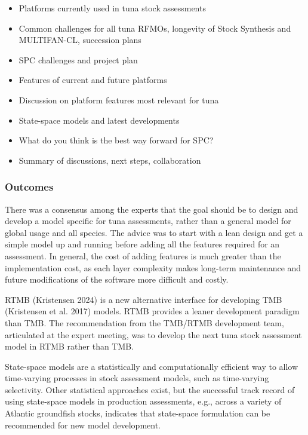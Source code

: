\documentclass{SCreport}
\begin{document}
\begin{itemize}
  \item Platforms currently used in tuna stock assessments\\[-4ex]
  \item Common challenges for all tuna RFMOs, longevity of Stock Synthesis and
  MULTIFAN-CL, succession plans\\[-4ex]
  \item SPC challenges and project plan\\[-4ex]
  \item Features of current and future platforms\\[-4ex]
  \item Discussion on platform features most relevant for tuna\\[-4ex]
  \item State-space models and latest developments\\[-4ex]
  \item What do you think is the best way forward for SPC?\\[-4ex]
  \item Summary of discussions, next steps, collaboration
\end{itemize}

\subsubsection{Outcomes}

There was a consensus among the experts that the goal should be to design and
develop a model specific for tuna assessments, rather than a general model for
global usage and all species. The advice was to start with a lean design and get
a simple model up and running before adding all the features required for an
assessment. In general, the cost of adding features is much greater than the
implementation cost, as each layer complexity makes long-term maintenance and
future modifications of the software more difficult and costly.

RTMB (Kristensen 2024) is a new alternative interface for developing TMB
(Kristensen et al. 2017) models. RTMB provides a leaner development paradigm
than TMB. The recommendation from the TMB/RTMB development team, articulated at
the expert meeting, was to develop the next tuna stock assessment model in RTMB
rather than TMB.

State-space models are a statistically and computationally efficient way to
allow time-varying processes in stock assessment models, such as time-varying
selectivity. Other statistical approaches exist, but the successful track record
of using state-space models in production assessments, e.g., across a variety of
Atlantic groundfish stocks, indicates that state-space formulation can be
recommended for new model development.
\end{document}

